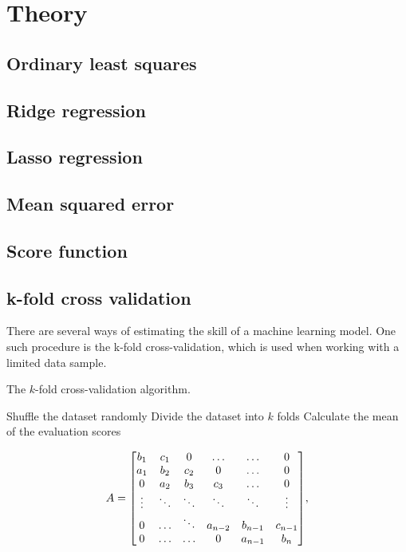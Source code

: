 \section{Theory}
\label{sec:theory}

\subsection{Ordinary least squares}

\subsection{Ridge regression}
	
\subsection{Lasso regression}

\subsection{Mean squared error}

\subsection{Score function}

\subsection{k-fold cross validation}
There are several ways of estimating the skill of a machine learning model. One such procedure is the k-fold cross-validation, which is used when working with a limited data sample. 

\begin{algorithm}[htbp]\label{alg:met}\caption{The $k$-fold cross-validation algorithm.}
	\SetAlgoLined
	\BlankLine
	\BlankLine
	Shuffle the dataset randomly\;
	Divide the dataset into $k$ folds\;
	Calculate the mean of the evaluation scores\;	
	\BlankLine
	\BlankLine
\end{algorithm}


\[A =
\mqty[b_1 & c_1 & 0 & \hdots & \hdots & 0 \\
a_1 & b_2 & c_2 & 0 & \hdots & 0 \\
0 & a_2 & b_3 & c_3 & \hdots & 0 \\
\vdots & \ddots & \ddots & \ddots & \ddots & \vdots \\
0 & \hdots & \ddots & a_{n-2} & b_{n-1} & c_{n-1} \\
0 & \hdots & \hdots & 0 & a_{n-1} & b_n],
\]
